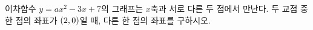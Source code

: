 이차함수 $y=ax^2-3x+7$의 그래프는 $x$축과 서로 다른 두 점에서 만난다. 두 교점 중 한 점의 좌표가 $(2{,}\mkern3mu\mathopen{}0)$일 때, 다른 한 점의 좌표를 구하시오. 
